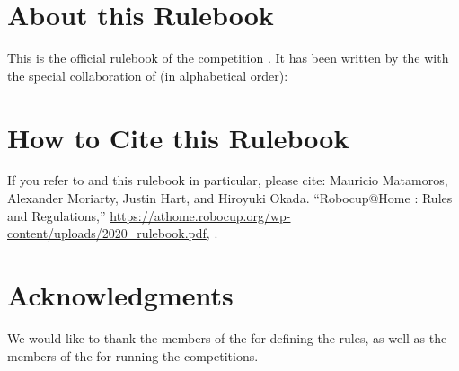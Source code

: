 


\section*{About this Rulebook}  
This is the official rulebook of the \AtHome{} competition \YEAR.
It has been written by the \YEAR{} \TC{} with the special collaboration of (in alphabetical order):



\section*{How to Cite this Rulebook} 
If you refer to \AtHome{} and this rulebook in particular, please cite:
Mauricio Matamoros, Alexander Moriarty, Justin Hart, and Hiroyuki Okada.
\enquote{Robocup@Home \YEAR: Rules and Regulations,}
\url{https://athome.robocup.org/wp-content/uploads/2020_rulebook.pdf}, \YEAR.

\begin{center}
\begin{minipage}{0.8\textwidth}
	\scriptsize%
	
\end{minipage}
\end{center}

\section*{Acknowledgments}
\label{sec:acknowledgments}
We would like to thank the members of the \TC{} for defining the rules, as well as the members of the \OC{} for running the competitions.

